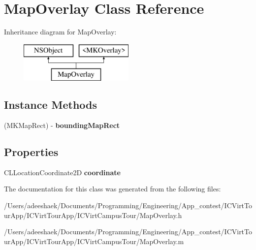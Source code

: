 \hypertarget{interface_map_overlay}{\section{Map\-Overlay Class Reference}
\label{interface_map_overlay}
}
Inheritance diagram for Map\-Overlay\-:\begin{figure}[H]
\begin{center}
\leavevmode
\includegraphics[height=2.000000cm]{interface_map_overlay}
\end{center}
\end{figure}
\subsection*{Instance Methods}
\begin{DoxyCompactItemize}
\item 
\hypertarget{interface_map_overlay_a24008687db1ebbcd71691fe071c28c65}{(M\-K\-Map\-Rect) -\/ {\bfseries bounding\-Map\-Rect}}\label{interface_map_overlay_a24008687db1ebbcd71691fe071c28c65}

\end{DoxyCompactItemize}
\subsection*{Properties}
\begin{DoxyCompactItemize}
\item 
\hypertarget{interface_map_overlay_aa284dfc828e69ed8a933afa71bcd119d}{C\-L\-Location\-Coordinate2\-D {\bfseries coordinate}}\label{interface_map_overlay_aa284dfc828e69ed8a933afa71bcd119d}

\end{DoxyCompactItemize}


The documentation for this class was generated from the following files\-:\begin{DoxyCompactItemize}
\item 
/\-Users/adeeshaek/\-Documents/\-Programming/\-Engineering/\-App\-\_\-contest/\-I\-C\-Virt\-Tour\-App/\-I\-C\-Virt\-Tour\-App/\-I\-C\-Virt\-Campus\-Tour/Map\-Overlay.\-h\item 
/\-Users/adeeshaek/\-Documents/\-Programming/\-Engineering/\-App\-\_\-contest/\-I\-C\-Virt\-Tour\-App/\-I\-C\-Virt\-Tour\-App/\-I\-C\-Virt\-Campus\-Tour/Map\-Overlay.\-m\end{DoxyCompactItemize}
